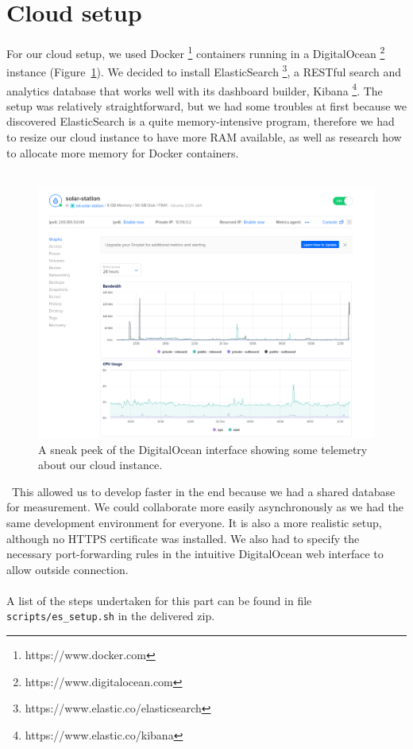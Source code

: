 \section*{Cloud setup}

For our cloud setup, we used Docker \footnote{https://www.docker.com} containers running in a DigitalOcean \footnote{https://www.digitalocean.com} instance (Figure~\ref{fig:do}).
We decided to install ElasticSearch \footnote{https://www.elastic.co/elasticsearch}, a RESTful search and analytics database that works well with its dashboard builder, Kibana \footnote{https://www.elastic.co/kibana}.
The setup was relatively straightforward, but we had some troubles at first because we discovered ElasticSearch is a quite memory-intensive program, therefore we had to resize our cloud instance to have more RAM available, as well as research how to allocate more memory for Docker containers. \\ \\
\begin{figure}[H]
    \centering
    \includegraphics[width=15cm]{../assets/png/digital-ocean-graph}
    \caption{A sneak peek of the DigitalOcean interface showing some telemetry about our cloud instance.}
    \label{fig:do}
\end{figure}\
This allowed us to develop faster in the end because we had a shared database for measurement.
We could collaborate more easily asynchronously as we had the same development environment for everyone.
It is also a more realistic setup, although no HTTPS certificate was installed.
We also had to specify the necessary port-forwarding rules in the intuitive DigitalOcean web interface to allow outside connection. \\ \\
A list of the steps undertaken for this part can be found in file \texttt{scripts/es\_setup.sh} in the delivered zip.
